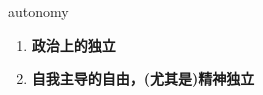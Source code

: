 
\begin{frame}
{\huge autonomy}
\begin{center}
\begin{enumerate}\Large
  \item \textbf{政治上的独立}
  \item \textbf{自我主导的自由，(尤其是)精神独立}
\end{enumerate}
\end{center}
\end{frame}
